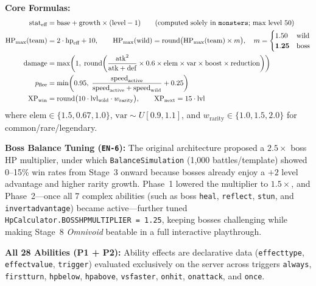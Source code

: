 \documentclass[10.5pt,a4paper]{article}
\DeclareRobustCommand{\code}[1]{\begingroup\def\_{\textunderscore\allowbreak}\texttt{#1}\endgroup}
\begin{document}
\textbf{Core Formulas:}
\begin{align*}
\text{stat}_{\text{eff}} &= \text{base} + \text{growth} \times (\text{level} - 1) \qquad (\text{computed solely in \texttt{monsters}; max level 50}) \\
\text{HP}_{\max}(\text{team}) &= 2 \cdot \text{hp}_{\text{eff}} + 10, \qquad
\text{HP}_{\max}(\text{wild}) = \text{round}\big(\text{HP}_{\max}(\text{team}) \times m\big), \quad m = \begin{cases} 1.50 & \text{wild} \\ \mathbf{1.25} & \text{boss} \end{cases} \\
\text{damage} &= \max\!\left(1,\; \text{round}\!\left(\frac{\text{atk}^2}{\text{atk} + \text{def}} \times 0.6 \times \text{elem} \times \text{var} \times \text{boost} \times \text{reduction}\right)\right) \\
p_{\text{flee}} &= \min\!\left(0.95,\; \frac{\text{speed}_{\text{active}}}{\text{speed}_{\text{active}} + \text{speed}_{\text{wild}}} + 0.25\right) \\
\text{XP}_{\text{win}} &= \text{round}\big(10 \cdot \text{lvl}_{\text{wild}} \cdot w_{\text{rarity}}\big), \qquad \text{XP}_{\text{next}} = 15 \cdot \text{lvl}
\end{align*}
where $\text{elem} \in \{1.5, 0.67, 1.0\}$, $\text{var} \sim U[0.9, 1.1]$, and $w_{\text{rarity}} \in \{1.0, 1.5, 2.0\}$ for common/rare/legendary.

\textbf{Boss Balance Tuning (\code{EN-6}):} The original architecture proposed a $2.5\times$ boss HP multiplier, under which \code{BalanceSimulation} (1,000 battles/template) showed 0–15\% win rates from Stage~3 onward because bosses already enjoy a $+2$ level advantage and higher rarity growth. Phase~1 lowered the multiplier to $1.5\times$, and Phase~2—once all 7 complex abilities (such as boss \code{heal}, \code{reflect}, \code{stun}, and \code{invert\_advantage}) became active—further tuned \code{HpCalculator.BOSS\_HP\_MULTIPLIER = 1.25}, keeping bosses challenging while making Stage~8 \emph{Omnivoid} beatable in a full interactive playthrough.

\textbf{All 28 Abilities (P1 + P2):} Ability effects are declarative data (\code{effect\_type}, \code{effect\_value}, \code{trigger}) evaluated exclusively on the server across triggers \code{always}, \code{first\_turn}, \code{hp\_below\_50}, \code{hp\_above\_50}, \code{vs\_faster}, \code{on\_hit}, \code{on\_attack}, and \code{once}.
\end{document}
